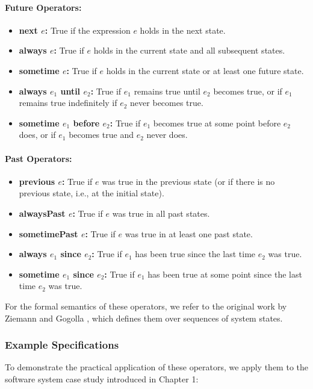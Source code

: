 \paragraph{Future Operators:}
\begin{itemize}
    \item \textbf{next $e$:} True if the expression $e$ holds in the next state.
    \item \textbf{always $e$:} True if $e$ holds in the current state and all subsequent states.
    \item \textbf{sometime $e$:} True if $e$ holds in the current state or at least one future state.
    \item \textbf{always $e_1$ until $e_2$:} True if $e_1$ remains true until $e_2$ becomes true, or if $e_1$ remains true indefinitely if $e_2$ never becomes true.
    \item \textbf{sometime $e_1$ before $e_2$:} True if $e_1$ becomes true at some point before $e_2$ does, or if $e_1$ becomes true and $e_2$ never does.
\end{itemize}

\paragraph{Past Operators:}
\begin{itemize}
    \item \textbf{previous $e$:} True if $e$ was true in the previous state (or if there is no previous state, i.e., at the initial state).
    \item \textbf{alwaysPast $e$:} True if $e$ was true in all past states.
    \item \textbf{sometimePast $e$:} True if $e$ was true in at least one past state.
    \item \textbf{always $e_1$ since $e_2$:} True if $e_1$ has been true since the last time $e_2$ was true.
    \item \textbf{sometime $e_1$ since $e_2$:} True if $e_1$ has been true at some point since the last time $e_2$ was true.
\end{itemize}

For the formal semantics of these operators, we refer to the original work by 
Ziemann and Gogolla \cite{TOCL}, which defines them over sequences of system states.

\subsubsection{Example Specifications}
To demonstrate the practical application of these operators, we apply them to 
the software system case study introduced in Chapter 1:

